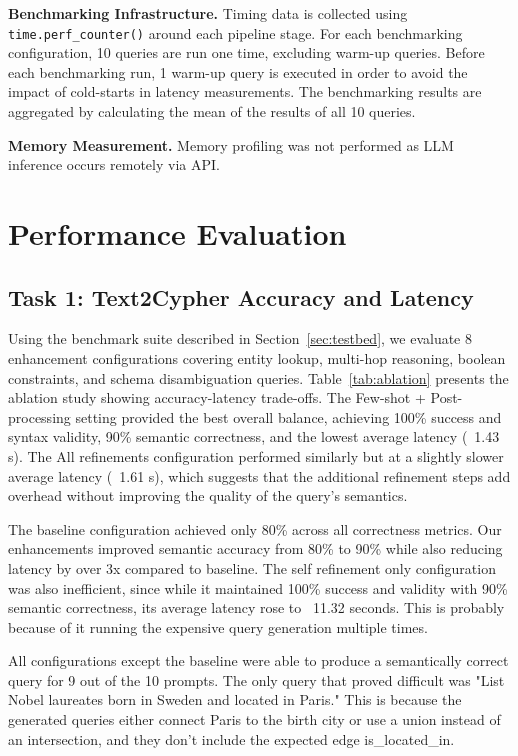 \documentclass[sigconf]{acmart}
\begin{document}
\textbf{Benchmarking Infrastructure.} Timing data is collected using \texttt{time.perf\_counter()} around each pipeline stage. For each benchmarking configuration, 10 queries are run one time, excluding warm-up queries. Before each benchmarking run, 1 warm-up query is executed in order to avoid the impact of cold-starts in latency measurements. The benchmarking results are aggregated by calculating the mean of the results of all 10 queries.

\textbf{Memory Measurement.} Memory profiling was not performed as LLM inference occurs remotely via API.

\section{Performance Evaluation}
\label{sec:evaluation}

\subsection{Task 1: Text2Cypher Accuracy and Latency}
\label{sec:eval-task1}

Using the benchmark suite described in Section~\ref{sec:testbed}, we evaluate 8 enhancement configurations covering entity lookup, multi-hop reasoning, boolean constraints, and schema disambiguation queries. Table~\ref{tab:ablation} presents the ablation study showing accuracy-latency trade-offs. The Few-shot + Post-processing setting provided the best overall balance, achieving 100\% success and syntax validity, 90\% semantic correctness, and the lowest average latency (~1.43 s). The All refinements configuration performed similarly but at a slightly slower average latency (~1.61 s), which suggests that the additional refinement steps add overhead without improving the quality of the query's semantics.

The baseline configuration achieved only 80\% across all correctness metrics. Our enhancements improved semantic accuracy from 80\% to 90\% while also reducing latency by over 3x compared to baseline. The self refinement only configuration was also inefficient, since while it maintained 100\% success and validity with 90\% semantic correctness, its average latency rose to ~11.32 seconds. This is probably because of it running the expensive query generation multiple times.

All configurations except the baseline were able to produce a semantically correct query for 9 out of the 10 prompts. The only query that proved difficult was "List Nobel laureates born in Sweden and located in Paris." This is because the generated queries either connect Paris to the birth city or use a union instead of an intersection, and they don’t include the expected edge is\_located\_in.
\end{document}
